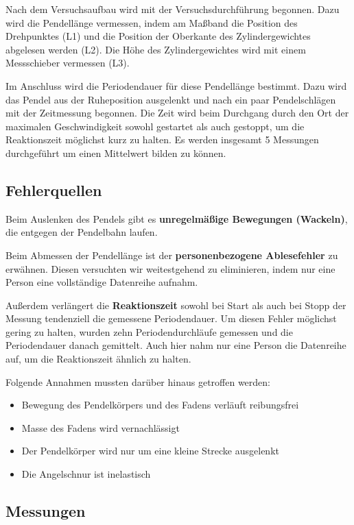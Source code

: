 \documentclass[
  9pt,
]{article}
\providecommand{\tightlist}{%
  \setlength{\itemsep}{0pt}\setlength{\parskip}{0pt}}
\begin{document}
Nach dem Versuchsaufbau wird mit der Versuchsdurchführung begonnen. Dazu
wird die Pendellänge vermessen, indem am Maßband die Position des
Drehpunktes (L1) und die Position der Oberkante des Zylindergewichtes
abgelesen werden (L2). Die Höhe des Zylindergewichtes wird mit einem
Messschieber vermessen (L3).

Im Anschluss wird die Periodendauer für diese Pendellänge bestimmt. Dazu
wird das Pendel aus der Ruheposition ausgelenkt und nach ein paar
Pendelschlägen mit der Zeitmessung begonnen. Die Zeit wird beim
Durchgang durch den Ort der maximalen Geschwindigkeit sowohl gestartet
als auch gestoppt, um die Reaktionszeit möglichst kurz zu halten. Es
werden insgesamt 5 Messungen durchgeführt um einen Mittelwert bilden zu
können.

\hypertarget{fehlerquellen}{%
\subsection{Fehlerquellen}\label{fehlerquellen}}

Beim Auslenken des Pendels gibt es \textbf{unregelmäßige Bewegungen
(Wackeln)}, die entgegen der Pendelbahn laufen.

Beim Abmessen der Pendellänge ist der \textbf{personenbezogene
Ablesefehler} zu erwähnen. Diesen versuchten wir weitestgehend zu
eliminieren, indem nur eine Person eine vollständige Datenreihe aufnahm.

Außerdem verlängert die \textbf{Reaktionszeit} sowohl bei Start als auch
bei Stopp der Messung tendenziell die gemessene Periodendauer. Um diesen
Fehler möglichst gering zu halten, wurden zehn Periodendurchläufe
gemessen und die Periodendauer danach gemittelt. Auch hier nahm nur eine
Person die Datenreihe auf, um die Reaktionszeit ähnlich zu halten.

Folgende Annahmen mussten darüber hinaus getroffen werden:

\begin{itemize}
\tightlist
\item
  Bewegung des Pendelkörpers und des Fadens verläuft reibungsfrei
\item
  Masse des Fadens wird vernachlässigt
\item
  Der Pendelkörper wird nur um eine kleine Strecke ausgelenkt
\item
  Die Angelschnur ist inelastisch
\end{itemize}

\hypertarget{messungen}{%
\subsection{Messungen}\label{messungen}}
\end{document}
